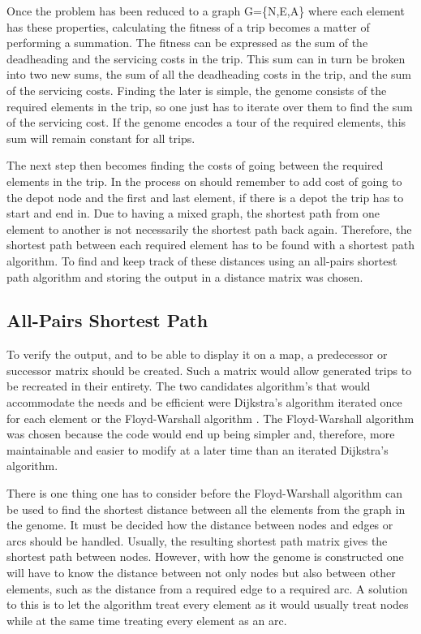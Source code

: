 Once the problem has been reduced to a graph G=\{N,E,A\} where each element has these properties, calculating the fitness of a trip becomes a matter of performing a summation. The fitness can be expressed as the sum of the deadheading and the servicing costs in the trip. This sum can in turn be broken into two new sums, the sum of all the deadheading costs in the trip, and the sum of the servicing costs. Finding the later is simple, the genome consists of the required elements in the trip, so one just has to iterate over them to find the sum of the servicing cost. If the genome encodes a tour of the required elements, this sum will remain constant for all trips.

The next step then becomes finding the costs of going between the required elements in the trip. In the process on should remember to add cost of going to the depot node and the first and last element, if there is a depot the trip has to start and end in. Due to having a mixed graph, the shortest path from one element to another is not necessarily the shortest path back again. Therefore, the shortest path between each required element has to be found with a shortest path algorithm. To find and keep track of these distances using an all-pairs shortest path algorithm and storing the output in a distance matrix was chosen.


\subsection{All-Pairs Shortest Path} %
\label{sub:all_pairs_shortest_path}

To verify the output, and to be able to display it on a map, a predecessor or successor matrix should be created. Such a matrix would allow generated trips to be recreated in their entirety. The two candidates algorithm's that would accommodate the needs and be efficient were Dijkstra's algorithm \citep{dijkstra1959note} iterated once for each element or the Floyd-Warshall algorithm \citep{floyd1962algorithm}. The Floyd-Warshall algorithm was chosen because the code would end up being simpler and, therefore, more maintainable and easier to modify at a later time than an iterated Dijkstra's algorithm.

There is one thing one has to consider before the Floyd-Warshall algorithm can be used to find the shortest distance between all the elements from the graph in the genome. It must be decided how the distance between nodes and edges or arcs should be handled. Usually, the resulting shortest path matrix gives the shortest path between nodes. However, with how the genome is constructed one will have to know the distance between not only nodes but also between other elements, such as the distance from a required edge to a required arc. A solution to this is to let the algorithm treat every element as it would usually treat nodes while at the same time treating every element as an arc.

